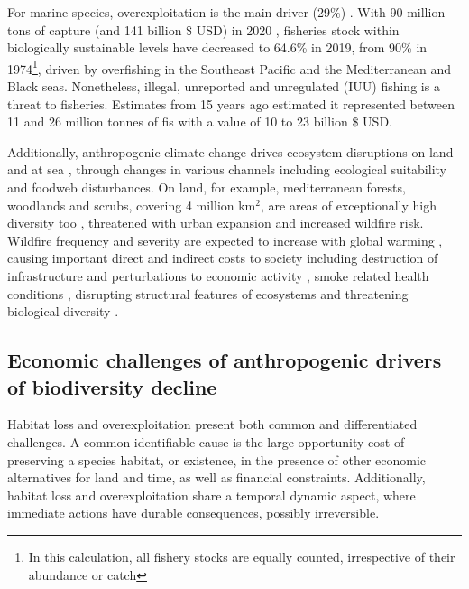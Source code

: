 For marine species, overexploitation is the main driver (29\%) \citep{ipbes_2022_6417333}. With 90 million tons of capture  (and 141 billion \$ USD)  in 2020 \citep{fao_2022_state}, fisheries stock within biologically sustainable levels have decreased to 64.6\% in 2019, from 90\% in 1974\footnote{ In this calculation, all fishery stocks are equally counted, irrespective of their abundance or catch}, driven by overfishing in the Southeast Pacific and the Mediterranean and Black seas. Nonetheless, illegal, unreported and unregulated (IUU) fishing is a threat to fisheries. Estimates from 15 years ago \citep{agnew_estimating_2009} estimated it represented between 11 and 26 million tonnes of fis with a value of 10 to 23 billion \$ USD. 
 
Additionally, anthropogenic climate change drives ecosystem disruptions on land \citep{burrell_anthropogenic_2020, conradi_reassessment_2024} and at sea \citep{gomes_marine_2024}, through changes in various channels including ecological suitability and foodweb disturbances. On land, for example, mediterranean forests, woodlands and scrubs, covering 4 million km$^2$, are areas of exceptionally high diversity too \citep{Mooney2001, blondel_2010}, threatened with urban expansion and increased wildfire risk. Wildfire frequency and severity are expected to increase with global warming \citep{Dupuy2019ClimateCI}, causing important direct and indirect costs to society including destruction of infrastructure and perturbations to economic activity \citep{wang_economic_2021}, smoke related health conditions \citep{burke_wildfire_2023, heft-neal_behavior_2023}, disrupting structural features of ecosystems \citep{Ayars2023} and threatening biological diversity \citep{Wintle2020}.

{}
\subsection*{Economic challenges of anthropogenic drivers of biodiversity decline}

Habitat loss and overexploitation present both common and differentiated challenges. A common identifiable cause is the large opportunity cost of preserving a species habitat, or existence, in the presence of other economic alternatives for land and time, as well as financial constraints. Additionally, habitat loss and overexploitation share a temporal dynamic aspect, where immediate actions have durable consequences, possibly irreversible.

